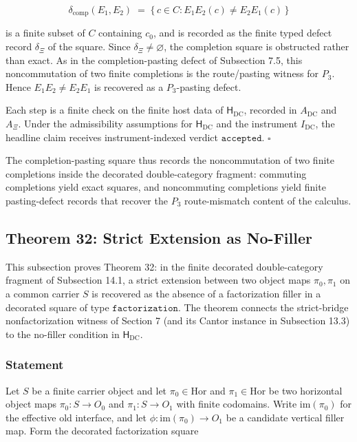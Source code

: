 \documentclass[11pt]{article}
\theoremstyle{definition}
\begin{document}
\[
\delta_{\mathrm{comp}}(E_{1},E_{2})\;=\;\bigl\{\,c\in C:E_{1}E_{2}(c)\neq E_{2}E_{1}(c)\,\bigr\}
\]

is a finite subset of \(C\) containing \(c_{0}\), and is recorded as the finite typed defect record \(\delta_{\Xi}\) of the square. Since \(\delta_{\Xi}\neq\varnothing\), the completion square is obstructed rather than exact. As in the completion-pasting defect of Subsection 7.5, this noncommutation of two finite completions is the route/pasting witness for \(P_{3}\). Hence \(E_{1}E_{2}\neq E_{2}E_{1}\) is recovered as a \(P_{3}\)-pasting defect.

Each step is a finite check on the finite host data of \(\mathsf H_{\mathrm{DC}}\), recorded in \(A_{\mathrm{DC}}\) and \(A_{\Xi}\). Under the admissibility assumptions for \(\mathsf H_{\mathrm{DC}}\) and the instrument \(I_{\mathrm{DC}}\), the headline claim receives instrument-indexed verdict \(\texttt{accepted}\). \(\square\)

The completion-pasting square thus records the noncommutation of two finite completions inside the decorated double-category fragment: commuting completions yield exact squares, and noncommuting completions yield finite pasting-defect records that recover the \(P_{3}\) route-mismatch content of the calculus.

\subsection{Theorem 32: Strict Extension as No-Filler}

This subsection proves Theorem 32: in the finite decorated double-category fragment of Subsection 14.1, a strict extension between two object maps \(\pi_{0},\pi_{1}\) on a common carrier \(S\) is recovered as the absence of a factorization filler in a decorated square of type \(\texttt{factorization}\). The theorem connects the strict-bridge nonfactorization witness of Section 7 (and its Cantor instance in Subsection 13.3) to the no-filler condition in \(\mathsf H_{\mathrm{DC}}\).

\subsubsection{Statement}

Let \(S\) be a finite carrier object and let \(\pi_{0}\in\mathrm{Hor}\) and \(\pi_{1}\in\mathrm{Hor}\) be two horizontal object maps \(\pi_{0}:S\to O_{0}\) and \(\pi_{1}:S\to O_{1}\) with finite codomains. Write \(\mathrm{im}(\pi_{0})\) for the effective old interface, and let \(\phi:\mathrm{im}(\pi_{0})\to O_{1}\) be a candidate vertical filler map. Form the decorated factorization square
\end{document}
